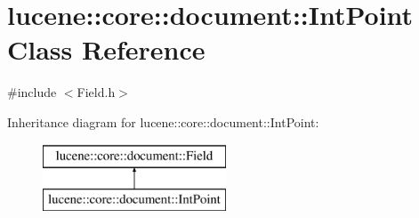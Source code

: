 \hypertarget{classlucene_1_1core_1_1document_1_1IntPoint}{}\section{lucene\+:\+:core\+:\+:document\+:\+:Int\+Point Class Reference}
\label{classlucene_1_1core_1_1document_1_1IntPoint}


{\ttfamily \#include $<$Field.\+h$>$}

Inheritance diagram for lucene\+:\+:core\+:\+:document\+:\+:Int\+Point\+:\begin{figure}[H]
\begin{center}
\leavevmode
\includegraphics[height=2.000000cm]{classlucene_1_1core_1_1document_1_1IntPoint}
\end{center}
\end{figure}
